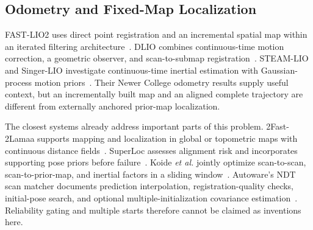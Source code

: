 \documentclass[journal,10pt,letterpaper]{IEEEtran}
\begin{document}
\subsection{Odometry and Fixed-Map Localization}
FAST-LIO2 uses direct point registration and an incremental spatial map within an iterated filtering architecture~\cite{fastlio2}. DLIO combines continuous-time motion correction, a geometric observer, and scan-to-submap registration~\cite{dlio}. STEAM-LIO and Singer-LIO investigate continuous-time inertial estimation with Gaussian-process motion priors~\cite{steam,singer}. Their Newer College odometry results supply useful context, but an incrementally built map and an aligned complete trajectory are different from externally anchored prior-map localization.

The closest systems already address important parts of this problem. 2Fast-2Lamaa supports mapping and localization in global or topometric maps with continuous distance fields~\cite{twofast}. SuperLoc assesses alignment risk and incorporates supporting pose priors before failure~\cite{superloc}. Koide \textit{et al.} jointly optimize scan-to-scan, scan-to-prior-map, and inertial factors in a sliding window~\cite{koide}. Autoware's NDT scan matcher documents prediction interpolation, registration-quality checks, initial-pose search, and optional multiple-initialization covariance estimation~\cite{autoware}. Reliability gating and multiple starts therefore cannot be claimed as inventions here.
\end{document}
